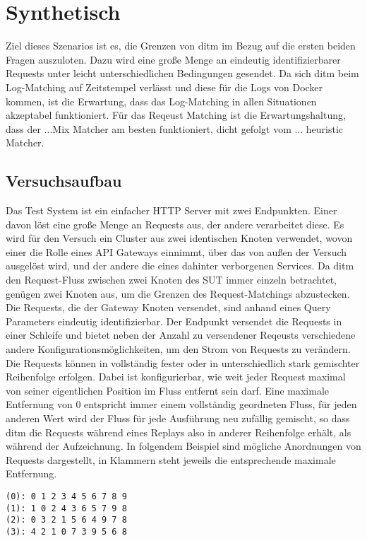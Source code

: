 \documentclass[12pt,a4paper]{report}
\begin{document}
\section{Synthetisch}
Ziel dieses Szenarios ist es, die Grenzen von ditm im Bezug auf die ersten beiden Fragen auszuloten.
Dazu wird eine große Menge an eindeutig identifizierbarer Requests unter leicht unterschiedlichen Bedingungen gesendet.
Da sich ditm beim Log-Matching auf Zeitstempel verlässt und diese für die Logs von Docker kommen, ist die Erwartung,
dass das Log-Matching in allen Situationen akzeptabel funktioniert. Für das Reqeust Matching ist die Erwartungshaltung, dass
der ...Mix Matcher am besten funktioniert, dicht gefolgt vom ... heuristic Matcher.
\subsection{Versuchsaufbau}
Das Test System ist ein einfacher HTTP Server mit zwei Endpunkten. Einer davon löst
eine große Menge an Requests aus, der andere verarbeitet diese. Es wird für den Versuch ein Cluster aus zwei identischen
Knoten verwendet, wovon einer die Rolle eines API Gateways einnimmt, über das von außen der Versuch ausgelöst wird,
und der andere die eines dahinter verborgenen Services. Da ditm den Request-Fluss zwischen zwei Knoten des SUT immer einzeln
betrachtet, genügen zwei Knoten aus, um die Grenzen des Request-Matchings abzustecken.
Die Requests, die der Gateway Knoten versendet, sind anhand eines Query Parameters eindeutig identifizierbar.
Der Endpunkt versendet die Requests in einer Schleife und bietet neben der Anzahl zu versendener Reqeusts verschiedene
andere Konfigurationsmöglichkeiten, um den Strom von Requests zu verändern.
Die Requests können in vollständig fester oder in unterschiedlich stark gemischter Reihenfolge erfolgen. Dabei ist konfigurierbar,
wie weit jeder Request maximal von seiner eigentlichen Position im Fluss entfernt sein darf. Eine maximale Entfernung
von 0 entspricht immer einem vollständig geordneten Fluss, für jeden anderen Wert wird der Fluss für jede Ausführung neu
zufällig gemischt, so dass ditm die Requests während eines Replays also in anderer Reihenfolge erhält, als während der
Aufzeichnung. In folgendem Beispiel sind mögliche Anordnungen von Requests dargestellt, in Klammern steht jeweils die
entsprechende maximale Entfernung.
\begin{verbatim}
(0): 0 1 2 3 4 5 6 7 8 9
(1): 1 0 2 4 3 6 5 7 9 8
(2): 0 3 2 1 5 6 4 9 7 8
(3): 4 2 1 0 7 3 9 5 6 8
\end{verbatim}
\end{document}
